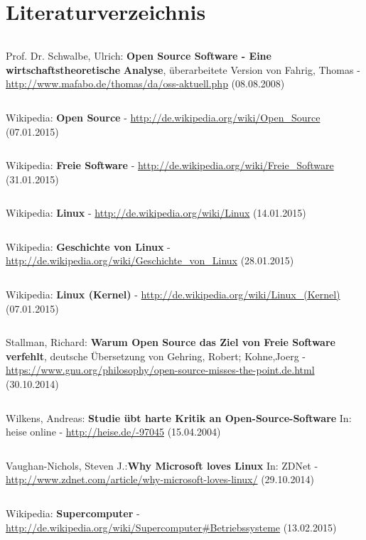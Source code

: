 \documentclass[a4paper,12pt]{article}
\begin{document}
\section{Literaturverzeichnis}
\begin{verbatim}
\end{verbatim}
Prof. Dr. Schwalbe, Ulrich: \textbf{Open Source Software - Eine wirtschaftstheoretische}
\newline
\textbf{Analyse}, überarbeitete Version von Fahrig, Thomas -
\newline
\url{http://www.mafabo.de/thomas/da/oss-aktuell.php} (08.08.2008)
\begin{verbatim}
\end{verbatim}
Wikipedia: \textbf{Open Source} - \url{http://de.wikipedia.org/wiki/Open_Source} (07.01.2015)
\begin{verbatim}
\end{verbatim}
Wikipedia: \textbf{Freie Software} - \url{http://de.wikipedia.org/wiki/Freie_Software} (31.01.2015)
\begin{verbatim}
\end{verbatim}
Wikipedia: \textbf{Linux} - \url{http://de.wikipedia.org/wiki/Linux} (14.01.2015)
\begin{verbatim}
\end{verbatim}
Wikipedia: \textbf{Geschichte von Linux} - \url{http://de.wikipedia.org/wiki/Geschichte_von_Linux} (28.01.2015)
\begin{verbatim}
\end{verbatim}
Wikipedia: \textbf{Linux (Kernel)} - \url{http://de.wikipedia.org/wiki/Linux_(Kernel)} (07.01.2015)
\begin{verbatim}
\end{verbatim}
Stallman, Richard: \textbf{Warum Open Source das Ziel von Freie Software verfehlt}, deutsche Übersetzung von Gehring, Robert; Kohne,Joerg - 
\newline
\url{https://www.gnu.org/philosophy/open-source-misses-the-point.de.html} (30.10.2014)
\begin{verbatim}
\end{verbatim}
Wilkens, Andreas: \textbf{Studie übt harte Kritik an Open-Source-Software} In: heise online - 
\newline
\url{http://heise.de/-97045} (15.04.2004)
\begin{verbatim}
\end{verbatim}
Vaughan-Nichols, Steven J.:\textbf{Why Microsoft loves Linux} In: ZDNet -
\newline
\url{http://www.zdnet.com/article/why-microsoft-loves-linux/} (29.10.2014)
\begin{verbatim}
\end{verbatim}
Wikipedia: \textbf{Supercomputer} - \url{http://de.wikipedia.org/wiki/Supercomputer#Betriebssysteme} (13.02.2015)
\end{document}
